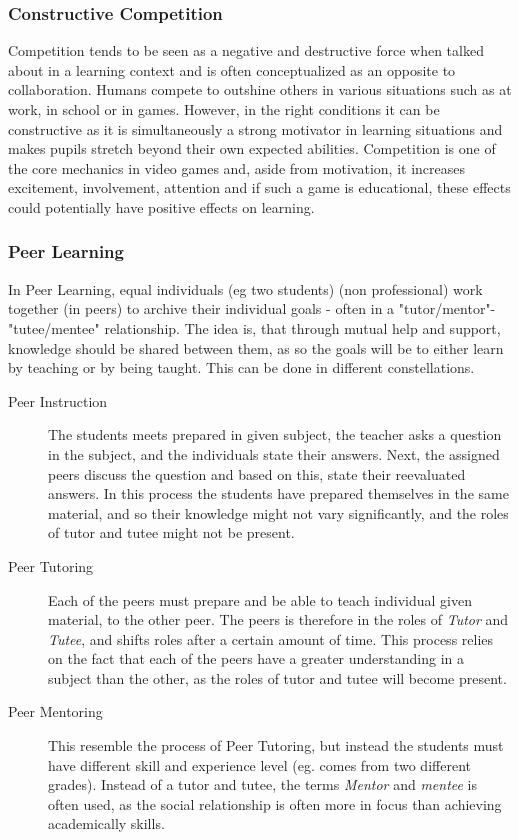 \subsubsection{Constructive Competition}
Competition tends to be seen as a negative and destructive force when talked about in a learning context and is often conceptualized as an opposite to collaboration\cite{collaborationCompetition}. Humans compete to outshine others in various situations such as at work, in school or in games\cite{collaborationCompetitionGames}\cite{collaborationCompetition}. However, in the right conditions it can be constructive as it is simultaneously a strong motivator in learning situations\cite{collaborationCompetitionGames} and makes pupils stretch beyond their own expected abilities\cite{collaborationCompetition}. Competition is one of the core mechanics in video games and, aside from  motivation, it increases excitement, involvement, attention and if such a game is educational, these effects could potentially have positive effects on learning\cite{collaborationCompetitionGames}. 

\subsubsection{Peer Learning} %
In Peer Learning, equal individuals (eg two students) (non professional) work together (in peers) to archive their individual goals \cite{peerLearning} - often in a "tutor/mentor"-"tutee/mentee" relationship. The idea is, that through mutual help and support, knowledge should be shared between them, as so the goals will be to either learn by teaching or by being taught. This can be done in different constellations\cite{collaborationCompetition}.

\begin{description}
	\item[Peer Instruction] The students meets prepared in given subject, the teacher asks a question in the subject, and the individuals state their answers. Next, the assigned peers discuss the question and based on this, state their reevaluated answers. In this process the students have prepared themselves in the same material, and so their knowledge might not vary significantly, and the roles of tutor and tutee might not be present.  
	
	\item[Peer Tutoring] Each of the peers must prepare and be able to teach individual given material, to the other peer. The peers is therefore in the roles of \textit{Tutor} and \textit{Tutee}, and shifts roles after a certain amount of time. This process relies on the fact that each of the peers have a greater understanding in a subject than the other, as the roles of tutor and tutee will become present.     

	\item[Peer Mentoring] This resemble the process of Peer Tutoring, but instead the students must have different skill and experience level (eg. comes from two different grades). Instead of a tutor and tutee, the terms \textit{Mentor} and \textit{mentee} is often used, as the social relationship is often more in focus than achieving academically skills.      
\end{description}   


